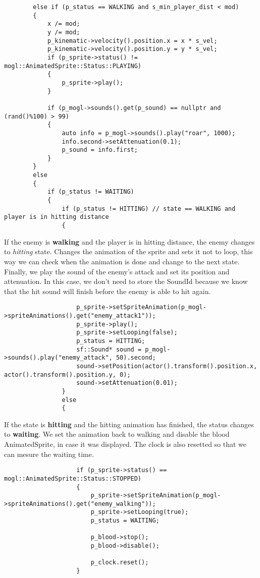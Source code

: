 \begin{lstlisting}
        else if (p_status == WALKING and s_min_player_dist < mod)
        {
            x /= mod;
            y /= mod;
            p_kinematic->velocity().position.x = x * s_vel;
            p_kinematic->velocity().position.y = y * s_vel;
            if (p_sprite->status() != mogl::AnimatedSprite::Status::PLAYING)
            {
                p_sprite->play();
            }

            if (p_mogl->sounds().get(p_sound) == nullptr and (rand()%100) > 99)
            {
                auto info = p_mogl->sounds().play("roar", 1000);
                info.second->setAttenuation(0.1);
                p_sound = info.first;
            }
        }
        else
        {
            if (p_status != WAITING)
            {
                if (p_status != HITTING) // state == WALKING and player is in hitting distance
                {
\end{lstlisting}

If the enemy is \textbf{walking} and the player is in hitting distance, the enemy changes 
to \textit{hitting} state. Changes the animation of the sprite and sets it not to loop, 
this way we can check when the animation is done and change to the next state. Finally, 
we play the sound of the enemy's attack and set its position and attenuation. In this case, 
we don't need to store the SoundId because we know that the hit sound will finish before the 
enemy is able to hit again.

\begin{lstlisting}
                    p_sprite->setSpriteAnimation(p_mogl->spriteAnimations().get("enemy_attack1"));
                    p_sprite->play();
                    p_sprite->setLooping(false);
                    p_status = HITTING;
                    sf::Sound* sound = p_mogl->sounds().play("enemy_attack", 50).second;
                    sound->setPosition(actor().transform().position.x, actor().transform().position.y, 0);
                    sound->setAttenuation(0.01);
                }
                else
                {
\end{lstlisting}

If the state is \textbf{hitting} and the hitting animation has finished, the status 
changes to \textbf{waiting}. We set the animation back to walking and disable the blood 
AnimatedSprite, in case it was displayed. The clock is also resetted so that we can mesure 
the waiting time.

\begin{lstlisting}
                    if (p_sprite->status() == mogl::AnimatedSprite::Status::STOPPED)
                    {
                        p_sprite->setSpriteAnimation(p_mogl->spriteAnimations().get("enemy_walking"));
                        p_sprite->setLooping(true);
                        p_status = WAITING;

                        p_blood->stop();
                        p_blood->disable();

                        p_clock.reset();
                    }
\end{lstlisting}

